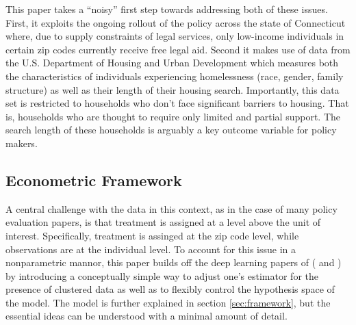 \documentclass[a4paper,12pt]{article}
\begin{document}
This paper takes a ``noisy'' first step towards addressing both of these issues. First, it exploits the ongoing rollout of the policy across the state of Connecticut where, due to supply constraints of legal services, only low-income individuals in certain zip codes currently receive free legal aid. Second it makes use of data from the U.S. Department of Housing and Urban Development which measures both the characteristics of individuals experiencing homelessness (race, gender, family structure) as well as their length of their housing search. Importantly, this data set is restricted to households who don't face significant barriers to housing. That is, households who are thought to require only limited and partial support. The search length of these households is arguably a key outcome variable for policy makers. \par 
\subsection{Econometric Framework}
A central challenge with the data in this context, as in the case of many policy evaluation papers, is that treatment is assigned at a level above the unit of interest. Specifically, treatment is assinged at the zip code level, while observations are at the individual level. To account for this issue in a nonparametric mannor, this paper builds off the deep learning papers of (\cite{finn2017model} and \cite{kelly2020learning}) by introducing a conceptually simple way to adjust one's estimator for the presence of clustered data as well as to flexibly control the hypothesis space of the model. The model is further explained in section \ref{sec:framework}, but the essential ideas can be understood with a minimal amount of detail. 
\end{document}
